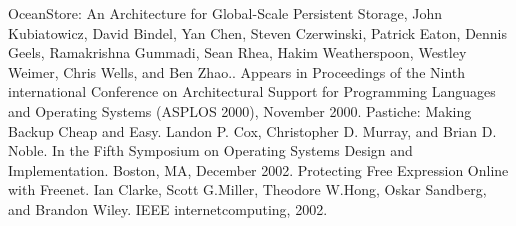 \documentclass[11pt]{article}
\begin{document}
\begin{thebibliography}{99}
 OceanStore: An Architecture for Global-Scale Persistent Storage, John Kubiatowicz, David Bindel, Yan Chen, Steven Czerwinski, Patrick Eaton, Dennis Geels, Ramakrishna Gummadi, Sean Rhea, Hakim Weatherspoon, Westley Weimer, Chris Wells, and Ben Zhao.. Appears in Proceedings of the Ninth international Conference on Architectural Support for Programming Languages and Operating Systems (ASPLOS 2000), November 2000.
 Pastiche: Making Backup Cheap and Easy. Landon P. Cox, Christopher D. Murray, and Brian D. Noble.  In the Fifth Symposium on Operating Systems Design and Implementation. Boston, MA, December 2002.
 Protecting Free Expression Online with Freenet. Ian Clarke, Scott G.Miller, Theodore W.Hong, Oskar Sandberg, and Brandon Wiley. IEEE internetcomputing,  2002.

\end{thebibliography}
\end{document}
